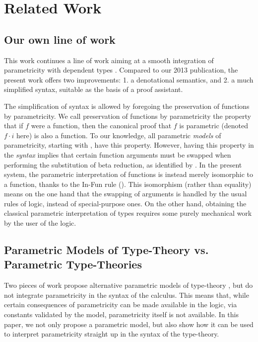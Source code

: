 \documentclass[english]{PaperTools/latex/lipics}
\newcommand\param[1]{\!\cdot\!#1}
\begin{document}
\section{Related Work}

\subsection{Our own line of work}
This work continues a line of work aiming at a smooth integration of
parametricity with dependent types
\citep{bernardy_proofs_2012,bernardy_computational_2012,bernardy_type-theory_2013}. Compared to our 2013 publication, the present work offers two improvements:
1. a denotational semantics, and
2. a much simplified syntax, suitable as the basis of a proof assistant.

The simplification of syntax is allowed by foregoing the preservation
of functions by parametricity. We call preservation of functions by
parametricity the property that if $f$ were a function, then the
canonical proof that $f$ is parametric (denoted $f \param i$ here) is
also a function. To our knowledge, all parametric \emph{models} of parametricity,
starting with \citet{reynolds_types_1983}, have this property.
However, having this property in the \emph{syntax} implies that
certain function arguments must be swapped when performing the
substitution of beta reduction, as identified by
\citet{bernardy_computational_2012}.  In the present system, the
parametric interpretation of functions is instead merely isomorphic to
a function, thanks to the {\sc In-Fun} rule (). This
isomorphism (rather than equality) means on the one hand that the
swapping of arguments is handled by the usual rules of logic, instead
of special-purpose ones. On the other hand, obtaining the classical
parametric interpretation of types requires some purely mechanical
work by the user of the logic.

\subsection{Parametric Models of Type-Theory vs. Parametric Type-Theories}

Two pieces of work propose alternative parametric models of
type-theory
\citep{atkey_relationally_2014,krishnaswami_internalizing_2013}, but
do not integrate parametricity in the syntax of the calculus. This
means that, while certain consequences of parametricity can be made
available in the logic, via constants validated by the model,
parametricity itself is not available. In this paper, we not only
propose a parametric model, but also show how it can be used to
interpret parametricity straight up in the syntax of the type-theory.
\end{document}
